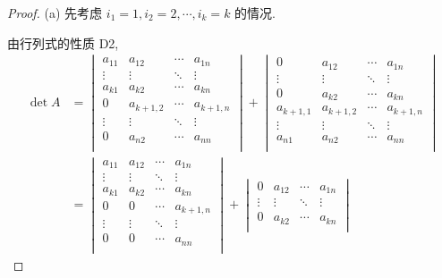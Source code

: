\documentclass[color=black,device=normal,lang=cn,mode=geye]{elegantnote}
\begin{document}
\begin{landscape}
\begin{proof}
    (a) 先考虑 $i_1=1,i_2=2,\cdots,i_k=k$ 的情况.

    由行列式的性质 D2,
    \begin{align*}
        \det A & =\begin{vmatrix}
            a_{11} & a_{12} & \cdots & a_{1n} \\
            \vdots & \vdots & \ddots & \vdots \\
            a_{k1} & a_{k2} & \cdots & a_{kn} \\
            0 & a_{k+1,2} & \cdots & a_{k+1,n} \\
            \vdots & \vdots & \ddots & \vdots \\
            0 & a_{n2} & \cdots & a_{nn} \\
        \end{vmatrix}+\begin{vmatrix}
            0 & a_{12} & \cdots & a_{1n} \\
            \vdots & \vdots & \ddots & \vdots \\
            0 & a_{k2} & \cdots & a_{kn} \\
            a_{k+1,1} & a_{k+1,2} & \cdots & a_{k+1,n} \\
            \vdots & \vdots & \ddots & \vdots \\
            a_{n1} & a_{n2} & \cdots & a_{nn} \\
        \end{vmatrix} \\
        & =\begin{vmatrix}
            a_{11} & a_{12} & \cdots & a_{1n} \\
            \vdots & \vdots & \ddots & \vdots \\
            a_{k1} & a_{k2} & \cdots & a_{kn} \\
            0 & 0 & \cdots & a_{k+1,n} \\
            \vdots & \vdots & \ddots & \vdots \\
            0 & 0 & \cdots & a_{nn} \\
        \end{vmatrix}+\begin{vmatrix}
            0 & a_{12} & \cdots & a_{1n} \\
            \vdots & \vdots & \ddots & \vdots \\
            0 & a_{k2} & \cdots & a_{kn} \\

\end{vmatrix}
\end{align*}
\end{proof}
\end{landscape}
\end{document}
